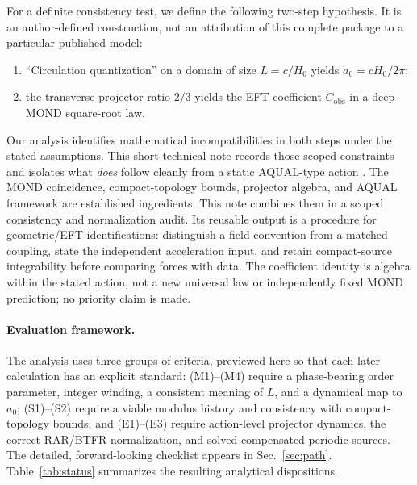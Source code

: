 \documentclass[aps,prd,reprint,superscriptaddress,nofootinbib,floatfix,showkeys]{revtex4-2}
\newcommand{\Cobs}{C_{\mathrm{obs}}}
\newcommand{\azero}{a_{0}}
\newcommand{\Hzero}{H_{0}}
\begin{document}
For a definite consistency test, we define the following two-step hypothesis.
It is an author-defined construction, not an attribution of this complete
package to a particular published model:
\begin{enumerate}
\item[(A)] ``Circulation quantization'' on a domain of size \(L=c/\Hzero\)
  yields \(\azero=c\Hzero/2\pi\);
\item[(B)] the transverse-projector ratio \(2/3\) yields the EFT coefficient
  \(\Cobs\) in a deep-MOND square-root law.
\end{enumerate}
Our analysis identifies mathematical incompatibilities in both steps under the
stated assumptions.  This short technical note records those scoped
constraints and isolates what \emph{does} follow cleanly from a static
AQUAL-type action \cite{bekenstein_milgrom}.
The MOND coincidence, compact-topology bounds, projector algebra, and AQUAL
framework are established ingredients. This note combines them in a scoped
consistency and normalization audit. Its reusable output is a procedure for
geometric/EFT identifications: distinguish a field convention from a matched
coupling, state the independent acceleration input, and retain compact-source
integrability before comparing forces with data. The coefficient identity is
algebra within the stated action, not a new universal law or independently
fixed MOND prediction; no priority claim is made.

\paragraph{Evaluation framework.}
The analysis uses three groups of criteria, previewed here so that each later
calculation has an explicit standard: (M1)--(M4) require a phase-bearing order
parameter, integer winding, a consistent meaning of \(L\), and a dynamical map
to \(\azero\); (S1)--(S2) require a viable modulus history and consistency with
compact-topology bounds; and (E1)--(E3) require action-level projector dynamics,
the correct RAR/BTFR normalization, and solved compensated periodic sources.
The detailed, forward-looking checklist appears in Sec.~\ref{sec:path}.
Table~\ref{tab:status} summarizes the resulting analytical dispositions.
\end{document}

